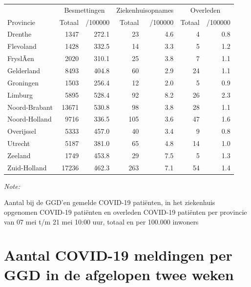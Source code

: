 \documentclass[
  english,
  man,floatsintext]{apa6}
\begin{document}
\begin{table}
\centering
\begin{threeparttable}
\begin{tabular}{lrrrrrr}
\toprule
\multicolumn{1}{c}{ } & \multicolumn{2}{c}{Besmettingen} & \multicolumn{2}{c}{Ziekenhuisopnames} & \multicolumn{2}{c}{Overleden} \\
\cmidrule(l{3pt}r{3pt}){2-3} \cmidrule(l{3pt}r{3pt}){4-5} \cmidrule(l{3pt}r{3pt}){6-7}
Provincie & Totaal & /100000 & Totaal & /100000 & Totaal & /100000\\
\midrule
Drenthe & 1347 & 272.1 & 23 & 4.6 & 4 & 0.8\\
Flevoland & 1428 & 332.5 & 14 & 3.3 & 5 & 1.2\\
FryslÃ¢n & 2020 & 310.1 & 25 & 3.8 & 7 & 1.1\\
Gelderland & 8493 & 404.8 & 60 & 2.9 & 24 & 1.1\\
Groningen & 1503 & 256.4 & 12 & 2.0 & 5 & 0.9\\
Limburg & 5895 & 528.4 & 92 & 8.2 & 26 & 2.3\\
Noord-Brabant & 13671 & 530.8 & 98 & 3.8 & 28 & 1.1\\
Noord-Holland & 9716 & 336.5 & 105 & 3.6 & 47 & 1.6\\
Overijssel & 5333 & 457.0 & 40 & 3.4 & 9 & 0.8\\
Utrecht & 5187 & 381.0 & 65 & 4.8 & 14 & 1.0\\
Zeeland & 1749 & 453.8 & 29 & 7.5 & 5 & 1.3\\
Zuid-Holland & 17236 & 462.3 & 263 & 7.1 & 54 & 1.4\\
\bottomrule
\end{tabular}
\begin{tablenotes}
\item \textit{Note: } 
\item Aantal bij de GGD’en gemelde COVID-19 patiënten, in het ziekenhuis opgenomen COVID-19 patiënten en overleden COVID-19 patiënten per provincie van 07 mei t/m 21 mei 10:00 uur, totaal en per 100.000 inwoners
\end{tablenotes}
\end{threeparttable}
\end{table}

\newpage

\hypertarget{aantal-covid-19-meldingen-per-ggd-in-de-afgelopen-twee-weken}{%
\section{Aantal COVID-19 meldingen per GGD in de afgelopen twee weken}\label{aantal-covid-19-meldingen-per-ggd-in-de-afgelopen-twee-weken}}
\end{document}
